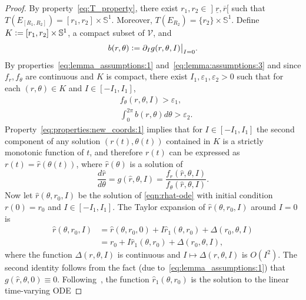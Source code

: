 \documentclass[journal,twoside,web, twocolumn]{ieeecolor}
\newcommand*{\Sone}{\mathbb{S}^1}
\newcommand*{\cV}{\mathcal{V}}
\newcommand*{\eqdef}{\vcentcolon=}
\begin{document}
\begin{proof}
By property~\eqref{eq:T_property}, there exist $r_1,r_2 \in \mathopen]\underline{r},\overline{r}[$ such that $T(E_{[R_1,R_2]}) = [r_1,r_2]\times \Sone$. Moreover, $T(E_{R_2}) = \{r_2 \} \times \Sone$. Define $K \eqdef [r_1,r_2]\times \Sone$, a compact subset of $\cV$, and 
\begin{equation}\label{eq:b_defn}
b(r,\theta) \eqdef \partial_I g(r,\theta,I)\big|_{I=0}.
\end{equation}
By properties~\eqref{eq:lemma_assumptions:1} and~\eqref{eq:lemma:assumptions:3}
and since $f_r, f_\theta$ are continuous and $K$ is compact, there exist
$I_1,\varepsilon_1,\varepsilon_2>0$ such that for each $(r,\theta) \in K$ and $I
\in [-I_1,I_1]$,
\begin{subequations}
\label{eq:properties:new_coords}
\begin{align}
&f_\theta(r,\theta,I) > \varepsilon_1,\label{eq:properties:new_coords:1}\\
& \int_0^{2\pi} b(r,\theta) d \theta > \varepsilon_2.\label{eq:properties:new_coords:2}
\end{align}
\end{subequations}
Property~\eqref{eq:properties:new_coords:1} implies that for $I \in [-I_1,I_1]$
the second component of any solution $(r(t),\theta(t))$ contained in $K$ is a
strictly monotonic function of $t$, and therefore $r(t)$  can be expressed as
$r(t) = \hat r(\theta(t))$, where $\hat r(\theta)$ is a solution of
    \begin{equation}\label{eqn:rhat-ode}
            \frac{d \hat r}{d \theta} = g(\hat r,\theta,I) = \frac{f_r(\hat r,\theta,I)}{f_\theta(\hat r,\theta,I)}. %
    \end{equation}
Now let \(\hat{r}(\theta,r_0,I)\) be the solution of \eqref{eqn:rhat-ode} with initial condition $r(0)=r_0$ and $I\in [-I_1,I_1]$. The Taylor expansion of $\hat{r}(\theta,r_0,I)$ around \(I = 0\) is
\begin{equation}\label{eq:Taylor_exp}
\begin{aligned}
\hat{r}(\theta,r_0,I) &= \hat{r}(\theta,r_0,0) + I\hat{r}_1(\theta,r_0) 
    + \Delta(r_0,\theta,I) \\
%
&=r_0 + I\hat{r}_1(\theta,r_0) + \Delta(r_0,\theta,I),
\end{aligned}
\end{equation}
where the function $\Delta(r,\theta,I)$ is continuous and $I \mapsto
\Delta(r,\theta,I)$ is $O(I^2)$.
The second identity follows from the fact (due to~\eqref{eq:lemma_assumptions:1}) that \(g(\hat{r},\theta,0) \equiv 0\). Following~\cite[Chapter 10]{khalil_nonlinear}, the function \(\hat{r}_1(\theta,r_0)\) is the solution to the linear time-varying ODE

\end{proof}
\end{document}
